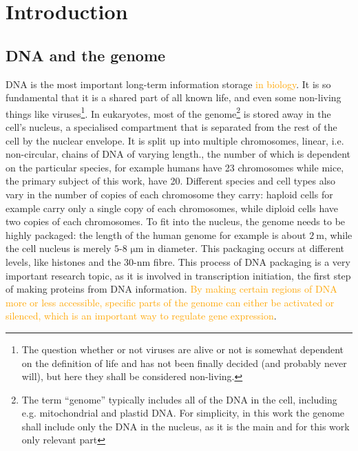 \documentclass[a4paper,11pt,oneside,final,english,toc=bib,draft]{scrbook}
\begin{document}
\tableofcontents
\clearpage

\mainmatter
\sloppy

% 
\chapter{Introduction} %
\label{cha:introduction}

\section{DNA and the genome} %
\label{sec:dna_and_genome}

DNA is the most important long-term information storage \textcolor{orange}{in biology}. It is so fundamental that it is a shared part of all known life, and even some non-living things like viruses\footnote{The question whether or not viruses are alive or not is somewhat dependent on the definition of life and has not been finally decided (and probably never will), but here they shall be considered non-living.}. In eukaryotes, most of the genome\footnote{The term \enquote{genome} typically includes all of the DNA in the cell, including e.g. mitochondrial and plastid DNA. For simplicity, in this work the genome shall include only the DNA in the nucleus, as it is the main and for this work only relevant part} is stored away in the cell's nucleus, a specialised compartment that is separated from the rest of the cell by the nuclear envelope. It is split up into multiple chromosomes, linear, i.e. non-circular, chains of DNA of varying length., the number of which is dependent on the particular species, for example humans have 23 chromosomes while mice, the primary subject of this work, have 20. Different species and cell types also vary in the number of copies of each chromosome they carry: haploid cells for example carry only a single copy of each chromosomes, while diploid cells have two copies of each chromosomes. To fit into the nucleus, the genome needs to be highly packaged: the length of the human genome for example is about \(\SI{2}{\metre}\), while the cell nucleus is merely \(5\)-\(8\) \(\si{\micro\metre}\) in diameter. This packaging occurs at different levels, like histones and the 30-nm fibre. This process of DNA packaging is a very important research topic, as it is involved in transcription initiation, the first step of making proteins from DNA information. \textcolor{orange}{By making certain regions of DNA more or less accessible, specific parts of the genome can either be activated or silenced, which is an important way to regulate gene expression}.
\end{document}
